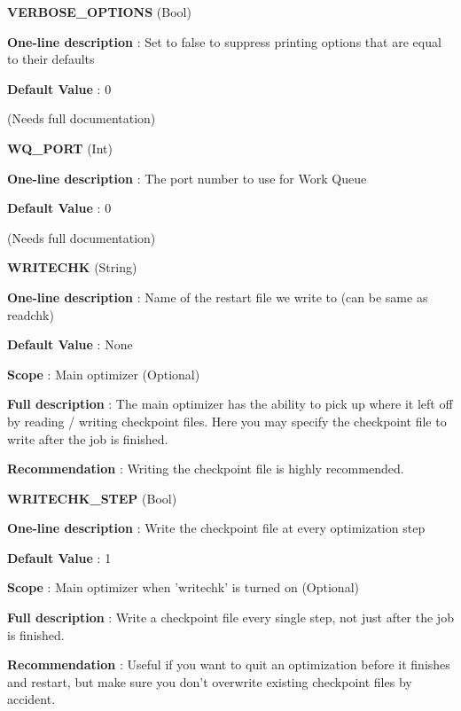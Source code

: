 \begin{DoxyItemize}
\item {\bfseries  V\-E\-R\-B\-O\-S\-E\-\_\-\-O\-P\-T\-I\-O\-N\-S } (Bool) \par
{\bfseries  One-\/line description }\-: Set to false to suppress printing options that are equal to their defaults \par
{\bfseries  Default Value }\-: 0 \par
(Needs full documentation)\end{DoxyItemize}
\begin{DoxyItemize}
\item {\bfseries  W\-Q\-\_\-\-P\-O\-R\-T } (Int) \par
{\bfseries  One-\/line description }\-: The port number to use for Work Queue \par
{\bfseries  Default Value }\-: 0 \par
(Needs full documentation)\end{DoxyItemize}
\begin{DoxyItemize}
\item {\bfseries  W\-R\-I\-T\-E\-C\-H\-K } (String) \par
{\bfseries  One-\/line description }\-: Name of the restart file we write to (can be same as readchk) \par
{\bfseries  Default Value }\-: None \par
{\bfseries  Scope }\-: Main optimizer (Optional) \par
{\bfseries  Full description }\-: The main optimizer has the ability to pick up where it left off by reading / writing checkpoint files. Here you may specify the checkpoint file to write after the job is finished. \par
{\bfseries  Recommendation }\-: Writing the checkpoint file is highly recommended.\end{DoxyItemize}
\begin{DoxyItemize}
\item {\bfseries  W\-R\-I\-T\-E\-C\-H\-K\-\_\-\-S\-T\-E\-P } (Bool) \par
{\bfseries  One-\/line description }\-: Write the checkpoint file at every optimization step \par
{\bfseries  Default Value }\-: 1 \par
{\bfseries  Scope }\-: Main optimizer when 'writechk' is turned on (Optional) \par
{\bfseries  Full description }\-: Write a checkpoint file every single step, not just after the job is finished. \par
{\bfseries  Recommendation }\-: Useful if you want to quit an optimization before it finishes and restart, but make sure you don't overwrite existing checkpoint files by accident.\end{DoxyItemize}
